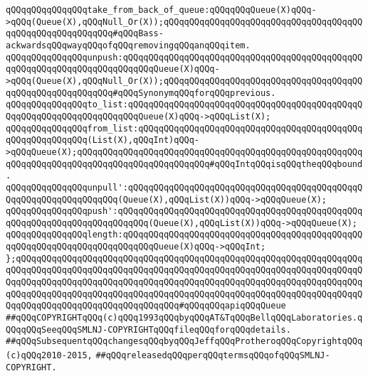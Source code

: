 \newline
\verb|qQQqqQQqqQQqqQQqtake_from_back_of_queue:qQQqqQQqQueue(X)qQQq->qQQq(Queue(X),qQQqNull_Or(X));qQQqqQQqqQQqqQQqqQQqqQQqqQQqqQQqqQQqqQQqqQQqqQQqqQQqqQQqqQQq#qQQqBass-ackwardsqQQqwayqQQqofqQQqremovingqQQqanqQQqitem.|\newline
\verb|qQQqqQQqqQQqqQQqunpush:qQQqqQQqqQQqqQQqqQQqqQQqqQQqqQQqqQQqqQQqqQQqqQQqqQQqqQQqqQQqqQQqqQQqqQQqqQQqQueue(X)qQQq->qQQq(Queue(X),qQQqNull_Or(X));qQQqqQQqqQQqqQQqqQQqqQQqqQQqqQQqqQQqqQQqqQQqqQQqqQQqqQQqqQQq#qQQqSynonymqQQqforqQQqprevious.|\newline
\newline
\verb|qQQqqQQqqQQqqQQqto_list:qQQqqQQqqQQqqQQqqQQqqQQqqQQqqQQqqQQqqQQqqQQqqQQqqQQqqQQqqQQqqQQqqQQqqQQqQueue(X)qQQq->qQQqList(X);|\newline
\verb|qQQqqQQqqQQqqQQqfrom_list:qQQqqQQqqQQqqQQqqQQqqQQqqQQqqQQqqQQqqQQqqQQqqQQqqQQqqQQqqQQq(List(X),qQQqInt)qQQq->qQQqQueue(X);qQQqqQQqqQQqqQQqqQQqqQQqqQQqqQQqqQQqqQQqqQQqqQQqqQQqqQQqqQQqqQQqqQQqqQQqqQQqqQQqqQQqqQQqqQQqqQQq#qQQqIntqQQqisqQQqtheqQQqbound.|\newline
\newline
\verb|qQQqqQQqqQQqqQQqunpull':qQQqqQQqqQQqqQQqqQQqqQQqqQQqqQQqqQQqqQQqqQQqqQQqqQQqqQQqqQQqqQQqqQQq(Queue(X),qQQqList(X))qQQq->qQQqQueue(X);|\newline
\verb|qQQqqQQqqQQqqQQqpush':qQQqqQQqqQQqqQQqqQQqqQQqqQQqqQQqqQQqqQQqqQQqqQQqqQQqqQQqqQQqqQQqqQQqqQQqqQQq(Queue(X),qQQqList(X))qQQq->qQQqQueue(X);|\newline
\newline
\verb|qQQqqQQqqQQqqQQqlength:qQQqqQQqqQQqqQQqqQQqqQQqqQQqqQQqqQQqqQQqqQQqqQQqqQQqqQQqqQQqqQQqqQQqqQQqqQQqQueue(X)qQQq->qQQqInt;|\newline
\verb|};qQQqqQQqqQQqqQQqqQQqqQQqqQQqqQQqqQQqqQQqqQQqqQQqqQQqqQQqqQQqqQQqqQQqqQQqqQQqqQQqqQQqqQQqqQQqqQQqqQQqqQQqqQQqqQQqqQQqqQQqqQQqqQQqqQQqqQQqqQQqqQQqqQQqqQQqqQQqqQQqqQQqqQQqqQQqqQQqqQQqqQQqqQQqqQQqqQQqqQQqqQQqqQQqqQQqqQQqqQQqqQQqqQQqqQQqqQQqqQQqqQQqqQQqqQQqqQQqqQQqqQQqqQQqqQQqqQQqqQQqqQQqqQQqqQQqqQQqqQQqqQQqqQQqqQQq#qQQqqQQqapiqQQqQueue|\newline
\newline
\newline
\verb|##qQQqCOPYRIGHTqQQq(c)qQQq1993qQQqbyqQQqAT&TqQQqBellqQQqLaboratories.qQQqqQQqSeeqQQqSMLNJ-COPYRIGHTqQQqfileqQQqforqQQqdetails.|\newline
\verb|##qQQqSubsequentqQQqchangesqQQqbyqQQqJeffqQQqProtheroqQQqCopyrightqQQq(c)qQQq2010-2015,|\newline
\verb|##qQQqreleasedqQQqperqQQqtermsqQQqofqQQqSMLNJ-COPYRIGHT.|\newline

